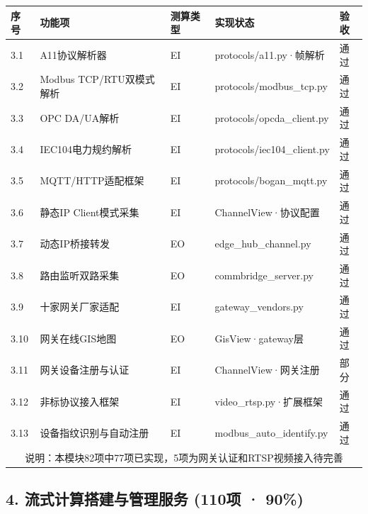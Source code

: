 \documentclass[11pt,a4paper]{ctexart}
\begin{document}
\begin{longtable}{p{1cm}p{4cm}p{3cm}p{3cm}p{2.5cm}}
\toprule
\textbf{序号} & \textbf{功能项} & \textbf{测算类型} & \textbf{实现状态} & \textbf{验收} \\
\midrule
3.1 & A11协议解析器 & EI & protocols/a11.py·帧解析 & \color{ok}通过 \\
3.2 & Modbus TCP/RTU双模式解析 & EI & protocols/modbus\_tcp.py & \color{ok}通过 \\
3.3 & OPC DA/UA解析 & EI & protocols/opcda\_client.py & \color{ok}通过 \\
3.4 & IEC104电力规约解析 & EI & protocols/iec104\_client.py & \color{ok}通过 \\
3.5 & MQTT/HTTP适配框架 & EI & protocols/bogan\_mqtt.py & \color{ok}通过 \\
3.6 & 静态IP Client模式采集 & EI & ChannelView·协议配置 & \color{ok}通过 \\
3.7 & 动态IP桥接转发 & EO & edge\_hub\_channel.py & \color{ok}通过 \\
3.8 & 路由监听双路采集 & EO & commbridge\_server.py & \color{ok}通过 \\
3.9 & 十家网关厂家适配 & EI & gateway\_vendors.py & \color{ok}通过 \\
3.10 & 网关在线GIS地图 & EO & GisView·gateway层 & \color{ok}通过 \\
3.11 & 网关设备注册与认证 & EI & ChannelView·网关注册 & \color{warn}部分 \\
3.12 & 非标协议接入框架 & EI & video\_rtsp.py·扩展框架 & \color{ok}通过 \\
3.13 & 设备指纹识别与自动注册 & EI & modbus\_auto\_identify.py & \color{ok}通过 \\
\midrule
\multicolumn{5}{c}{说明：本模块82项中77项已实现，5项为网关认证和RTSP视频接入待完善} \\
\bottomrule
\end{longtable}

\subsection{4. 流式计算搭建与管理服务 (110项 · 90\%)}
\end{document}
